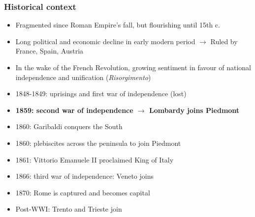 \documentclass[10pt]{beamer}
\begin{document}
\begin{frame}
    \frametitle{Historical context}
    
    \begin{itemize}
        \item Fragmented since Roman Empire's fall, but flourishing until 15th c.
        \item Long political and economic decline in early modern period $\rightarrow$ Ruled by France, Spain, Austria
        \item In the wake of the French Revolution, growing sentiment in favour of national independence and unification (\textit{Risorgimento})
        \item 1848-1849: uprisings and first war of independence (lost)
        \item \textbf{1859: second war of independence $\rightarrow$ Lombardy joins Piedmont}
        \item 1860: Garibaldi conquers the South
        \item 1860: plebiscites across the peninsula to join Piedmont
        \item 1861: Vittorio Emanuele II proclaimed King of Italy
        \item 1866: third war of independence: Veneto joins
        \item 1870: Rome is captured and becomes capital
        \item Post-WWI: Trento and Trieste join
    \end{itemize}
    
\end{frame}
\end{document}

